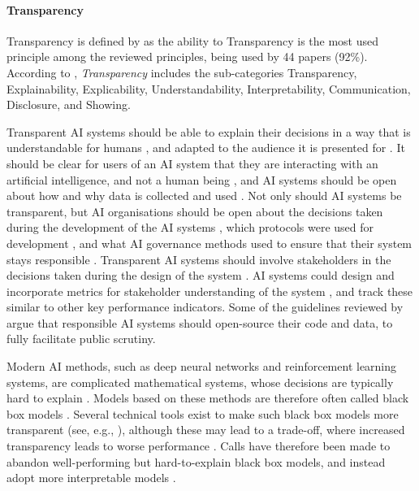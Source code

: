 \paragraph{Transparency}
Transparency is defined by \textcite[p.~2]{Dignum_2017} as the ability to  Transparency is the most used principle among the reviewed principles, being used by 44 papers (92\%). According to \textcite{Ryan_2021}, \textit{Transparency} includes the sub-categories Transparency, Explainability, Explicability, Understandability, Interpretability, Communication, Disclosure, and Showing.

Transparent AI systems should be able to explain their decisions in a way that is understandable for humans \parencite{Clarke_2019}, and adapted to the audience it is presented for \parencite{BarredoArrieta_2020,Hacker_2022}. It should be clear for users of an AI system that they are interacting with an artificial intelligence, and not a human being \parencite{Clarke_2019,Nauck_2019}, and AI systems should be open about how and why data is collected and used \parencite{Jobin_2019,Clarke_2019}. Not only should AI systems be transparent, but AI organisations should be open about the decisions taken during the development of the AI systems \parencite{Vakkuri_2022}, which protocols were used for development \parencite{vanBruxvoort_2021}, and what AI governance methods used to ensure that their system stays responsible \parencite{Dignum_2017,Dignum_2019}. Transparent AI systems should involve stakeholders in the decisions taken during the design of the system \parencite{Dignum_2019}. AI systems could design and incorporate metrics for stakeholder understanding of the system \parencite{Havrda_2020}, and track these similar to other key performance indicators. Some of the guidelines reviewed by \textcite{Jobin_2019,Fjeld_2020} argue that responsible AI systems should open-source their code and data, to fully facilitate public scrutiny.


Modern AI methods, such as deep neural networks and reinforcement learning systems, are complicated mathematical systems, whose decisions are typically hard to explain \parencite{BarredoArrieta_2020}. Models based on these methods are therefore often called black box models \parencite{Bélisle-Pipon_2022}. Several technical tools exist to make such black box models more transparent (see, e.g., \cite{BarredoArrieta_2020}), although these may lead to a trade-off, where increased transparency leads to worse performance \parencite{BarredoArrieta_2020}. Calls have therefore been made to abandon well-performing but hard-to-explain black box models, and instead adopt more interpretable models \parencite{Rudin_2019,Rizinski_2022,BarredoArrieta_2020}.

